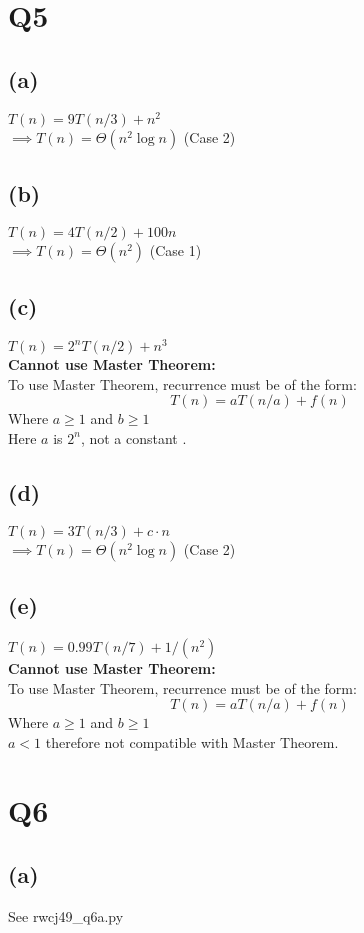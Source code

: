 \documentclass[12pt]{article}%
\begin{document}
\section*{Q5}
\subsection*{(a)}
$T(n) = 9T(n/3) + n^2$\\
\bigskip
$\implies T(n) = \Theta(n^2 \log n)$ (Case 2)

\subsection*{(b)}
$T(n) = 4T(n/2) + 100n$ \\
\bigskip
$\implies T(n) = \Theta(n^2)$ (Case 1)


\subsection*{(c)}
$T(n) = 2^nT(n/2) + n^3$\\
\textbf{Cannot use Master Theorem:} \\
\noindent
To use Master Theorem, recurrence must be of the form:
$$T(n) = aT(n/a) + f(n)$$ Where $a \geq 1$ and $b \geq 1$\\
Here $a$ is $2^n$, not a constant .
\subsection*{(d)}
$T(n) = 3T(n/3) + c\cdot n$\\
\bigskip
$\implies T(n) = \Theta(n^2 \log n)$ (Case 2)

\subsection*{(e)}
$T(n) = 0.99T(n/7) + 1/(n^2)$ \\
\textbf{Cannot use Master Theorem:} \\
\noindent
To use Master Theorem, recurrence must be of the form:
$$T(n) = aT(n/a) + f(n)$$ Where $a \geq 1$ and $b \geq 1$\\
$a < 1$ therefore not compatible with Master Theorem.
\newpage

\section*{Q6}
\subsection*{(a)}
See rwcj49\_q6a.py
\end{document}
